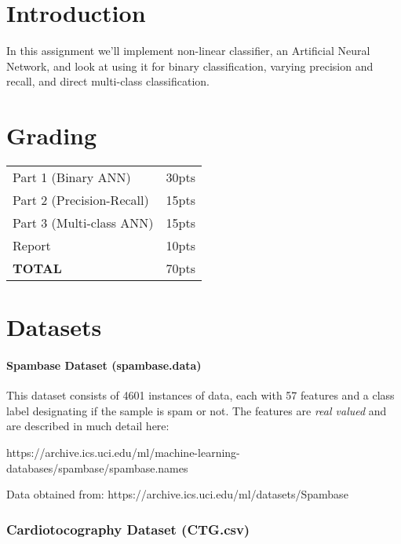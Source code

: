 \documentclass[12pt]{article}
\begin{document}
\maketitle


\section*{Introduction}
In this assignment we'll implement non-linear classifier, an Artificial Neural Network, and look at using it for binary classification, varying precision and recall, and direct multi-class classification.  


\section*{Grading}
\begin{table}[h]
\begin{center}
\begin{tabular}{|l|l|}
\hline
Part 1 (Binary ANN) & 30pts\\
Part 2 (Precision-Recall) & 15pts\\
Part 3 (Multi-class ANN) & 15pts\\
Report & 10pts\\
\hline
\textbf{TOTAL} & 70pts\\
\hline
\end{tabular}
\end{center}
\end{table}

\newpage
\section*{Datasets}
\paragraph{Spambase Dataset  (spambase.data)}
This dataset consists of 4601 instances of data, each with 57 features and a class label designating if the sample is spam or not.
The features are \emph{real valued} and are described in much detail here:
\begin{center}
  https://archive.ics.uci.edu/ml/machine-learning-databases/spambase/spambase.names\\
\end{center}

\noindent
Data obtained from:  https://archive.ics.uci.edu/ml/datasets/Spambase

\subsubsection*{Cardiotocography Dataset  (CTG.csv)}
\end{document}
